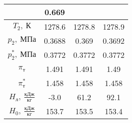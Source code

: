 \documentclass[a4paper,10pt]{article}
\begin{document}
\begin{longtable}{
    |
%    
    c|
%    
    c|
%    
    c|
%    
    c|
%    
    }
        & 0.669
%        
        \\
        \hline
%        
        $T_2,\ К$
%        
        & 1278.6
%        
        & 1278.8
%        
        & 1278.9
%        
        \\
        \hline
%        
        $p_2,\ МПа$
%        
        & 0.3688
%        
        & 0.369
%        
        & 0.3692
%        
        \\
        \hline
%        
        $p_2^*,\ МПа$
%        
        & 0.3772
%        
        & 0.3772
%        
        & 0.3772
%        
        \\
        \hline
%        
        $\pi_т$
%        
        & 1.491
%        
        & 1.491
%        
        & 1.49
%        
        \\
        \hline
%        
        $\pi_т^*$
%        
        & 1.458
%        
        & 1.458
%        
        & 1.458
%        
        \\
        \hline
%        
        $H_л,\ \frac{кДж}{кг}$
%        
        & -3.0
%        
        & 61.2
%        
        & 92.1
%        
        \\
        \hline
%        
        $H_0,\ \frac{кДж}{кг}$
%        
        & 153.7
%        
        & 153.5
%        
        & 153.4
%        
        \\
        \hline
%        

    \end{longtable}

%        
\end{document}
